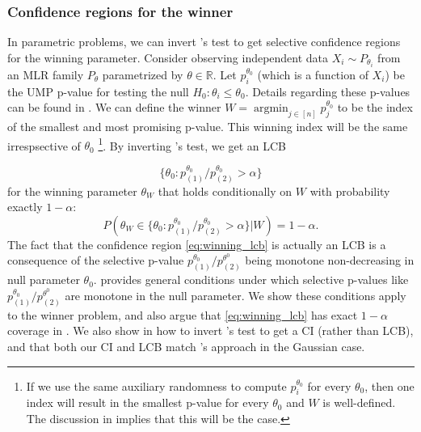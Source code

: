 \documentclass{article}
\DeclareMathOperator*{\argmin}{argmin}
\newcommand{\R}{\mathbb{R}}
\begin{document}
\subsubsection{Confidence regions for the winner}

In parametric problems, we can invert 's test to get selective confidence regions for the winning parameter. Consider observing independent data $X_i \sim P_{\theta_i}$ from an MLR family $P_{\theta}$ parametrized by $\theta \in \R$. Let $p_i^{\theta_0}$ (which is a function of $X_i$) be the UMP p-value for testing the null $H_0 : \theta_i \leq \theta_0$. Details regarding these p-values can be found in . We can define the winner $W = \argmin_{j \in [n]} p_j^{\theta_0}$ to be the index of the smallest and most promising p-value. This winning index will be the same irrespsective of $\theta_0$  \footnote{If we use the same auxiliary randomness to compute $p_i^{\theta_0}$ for every $\theta_0$, then one index will result in the smallest p-value for every $\theta_0$ and $W$ is well-defined. The discussion in  implies that this will be the case. }. By inverting 's test, we get an LCB

\begin{equation}
    \label{eq:winning_lcb}
    \{\theta_0 : p^{\theta_0}_{(1)}/p^{\theta_0}_{(2)} > \alpha  \}
\end{equation}
for the winning parameter $\theta_W$ that holds conditionally on $W$ with probability exactly $1-\alpha$:
\begin{equation*}
    P( \theta_W \in\{\theta_0 : p^{\theta_0}_{(1)}/p^{\theta_0}_{(2)} > \alpha  \} |W ) = 1-\alpha.
\end{equation*}
The fact that the confidence region \eqref{eq:winning_lcb} is actually an LCB is a consequence of the selective p-value $p_{(1)}^{\theta_0}/p^{\theta^0}_{(2)}$ being monotone non-decreasing in null parameter $\theta_0$.  provides general conditions under which selective p-values like $p_{(1)}^{\theta_0}/p^{\theta^0}_{(2)}$ are monotone in the null parameter. We show these conditions apply to the winner problem, and also argue that \eqref{eq:winning_lcb} has exact $1-\alpha$ coverage in . We also show in  how to invert 's test to get a CI (rather than LCB), and that both our CI and LCB match \cite{Fithian2017}'s approach in the Gaussian case. 
\end{document}
